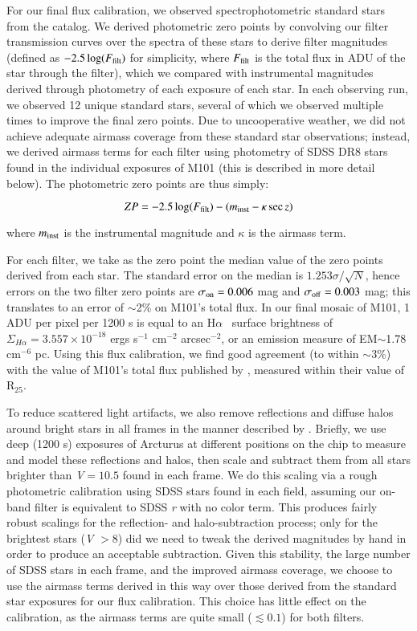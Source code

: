 \documentclass[iop]{emulateapj}
\newcommand{\ha}{H$\alpha$}
\begin{document}
For our final flux calibration, we observed spectrophotometric
standard stars from the \citet{massey88} catalog.  We derived
photometric zero points by convolving our filter transmission curves
over the spectra of these stars to derive filter magnitudes (defined
as $-2.5 \log(F_{\rm filt})$ for simplicity, where $F_{\rm filt}$ is
the total flux in ADU of the star through the filter), which we
compared with instrumental magnitudes derived through photometry of
each exposure of each star.  In each observing run, we observed 12
unique standard stars, several of which we observed multiple times to
improve the final zero points.  Due to uncooperative weather, we did
not achieve adequate airmass coverage from these standard star
observations; instead, we derived airmass terms for each filter using
photometry of SDSS DR8 \citep{aihara11} stars found in the individual
exposures of M101 (this is described in more detail below).  The
photometric zero points are thus simply:

\begin{equation}
  ZP = -2.5\log(F_{\rm filt}) - (m_{\rm inst} - \kappa \sec z)
\end{equation}

where $m_{\rm inst}$ is the instrumental magnitude and $\kappa$ is the
airmass term.

For each filter, we take as the zero point the median value of the
zero points derived from each star.  The standard error on the median
is $1.253\sigma/\sqrt{N}$, hence errors on the two filter zero points
are $\sigma_{\rm on} = 0.006$ mag and $\sigma_{\rm off} = 0.003$ mag; this
translates to an error of $\sim$2\% on M101's total flux.  In our
final mosaic of M101, 1 ADU per pixel per 1200 s is equal to an \ha
\ surface brightness of $\Sigma_{H\alpha} = 3.557 \times 10^{-18}$
ergs s$^{-1}$ cm$^{-2}$ arcsec$^{-2}$, or an emission measure of
EM$\sim$1.78 cm$^{-6}$ pc.  Using this flux calibration, we find good
agreement (to within $\sim$3\%) with the value of M101's total
flux published by \citet{kennicutt08}, measured within their value of
R$_{25}$.

To reduce scattered light artifacts, we also remove reflections and
diffuse halos around bright stars in all frames in the manner
described by \citet{slater09}.  Briefly, we use deep (1200 s) exposures
of Arcturus at different positions on the chip to measure and model
these reflections and halos, then scale and subtract them from all
stars brighter than \emph{V}$=10.5$ found in each frame.  We do this
scaling via a rough photometric calibration using SDSS stars found in
each field, assuming our on-band filter is equivalent to SDSS \emph{r}
with no color term.  This produces fairly robust scalings for the
reflection- and halo-subtraction process; only for the brightest stars
(\emph{V} $>8$) did we need to tweak the derived magnitudes by hand in
order to produce an acceptable subtraction.  Given this stability, the
large number of SDSS stars in each frame, and the improved airmass
coverage, we choose to use the airmass terms derived in this way over
those derived from the standard star exposures for our flux
calibration.  This choice has little effect on the calibration, as the
airmass terms are quite small ($\lesssim 0.1$) for both filters.
\end{document}
